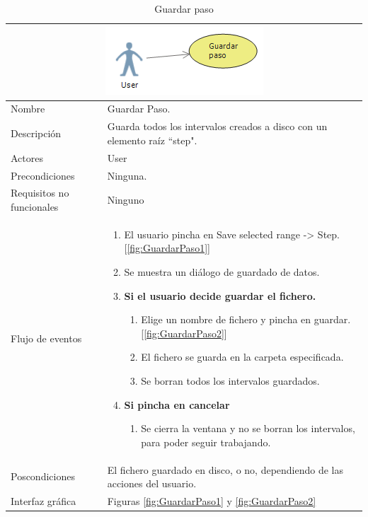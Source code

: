 \begin{table}[H]
	\begin{center}
		\begin{tabular}{|l*{1}{p{10cm}}|}
			
			\multicolumn{2}{c}{\includegraphics[width=0.4\linewidth]{./Figures/GuardarPaso.png}} \\
			\hline
		    Nombre                     & Guardar Paso. \\
		    Descripci\'on              & Guarda todos los intervalos creados
		    							 a disco con un elemento ra\'iz ``step".\\ 
		    Actores                    & User  \\
		    Precondiciones             & Ninguna.  \\
		    Requisitos no funcionales  & Ninguno  \\
		    Flujo de eventos           & \begin{enumerate}
		    								\item El usuario pincha en Save selected range -> Step. [\ref{fig:GuardarPaso1}]
		    								\item Se muestra un di\'alogo de guardado de datos.
		    								\item \textbf{Si el usuario decide guardar
		    								el fichero.}
		    								\begin{enumerate}
		    									\item Elige un nombre de fichero y pincha
		    									en guardar. [\ref{fig:GuardarPaso2}]
		    									\item El fichero se guarda en la carpeta
		    									especificada.
		    									\item Se borran todos los intervalos
		    									guardados.
		    								\end{enumerate}
		    								\item \textbf{Si pincha en cancelar}
		    								\begin{enumerate}
		    									\item Se cierra la ventana y no se borran
		    									los intervalos, para poder seguir trabajando.
		    								\end{enumerate}
		    								
		    							 \end{enumerate} \\
		    Poscondiciones			   & El fichero guardado en disco, o no,
		    						     dependiendo de las acciones del usuario.  \\
		    Interfaz gr\'afica		   & Figuras \ref{fig:GuardarPaso1} y \ref{fig:GuardarPaso2}\\
		    \hline
		\end{tabular}
	\caption[Guardar paso]{Guardar paso}
	\label{Guardar paso}
	\end{center}
\end{table}


